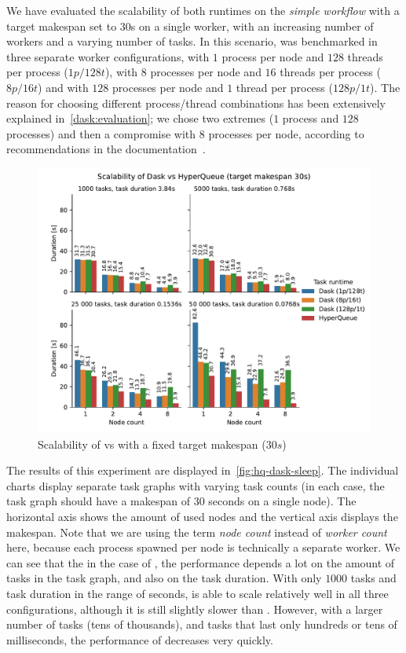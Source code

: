 We have evaluated the scalability of both runtimes on the \emph{simple workflow} with a target
makespan set to $30$s on a single worker, with an increasing number of workers and a varying
number of tasks. In this scenario, \dask{} was benchmarked in three separate worker
configurations, with $1$ process per node and $128$ threads per
process ($1p/128t$), with $8$ processes per node and
$16$ threads per process ($8p/16t$) and with $128$
processes per node and $1$ thread per process ($128p/1t$). The
reason for choosing different process/thread combinations has been extensively explained
in~\autoref{dask:evaluation}; we chose two extremes ($1$ process and
$128$ processes) and then a compromise with $8$ processes per
node, according to recommendations in the \dask{}
documentation~\cite{dask-thread-recommendation}.

\begin{figure}[h]
	\centering
	\includegraphics[width=\textwidth]{imgs/hq/charts/dask-vs-hq-sleep}
	\caption{Scalability of \hyperqueue{} vs \dask{} with a fixed target makespan
	($30s$)}
	\label{fig:hq-dask-sleep}
\end{figure}

The results of this experiment are displayed in~\autoref{fig:hq-dask-sleep}. The individual charts
display separate task graphs with varying task counts (in each case, the task graph should have a
makespan of $30$ seconds on a single node). The horizontal axis shows the amount
of used nodes and the vertical axis displays the makespan. Note that we are using the term
\emph{node count} instead of \emph{worker count} here, because each
\dask{} process spawned per node is technically a separate worker. We can see that
the in the case of \dask{}, the performance depends a lot on the amount of tasks in
the task graph, and also on the task duration. With only $1000$ tasks and task
duration in the range of seconds, \dask{} is able to scale relatively well in all
three configurations, although it is still slightly slower than \hyperqueue{}. However,
with a larger number of tasks (tens of thousands), and tasks that last only hundreds or tens of
milliseconds, the performance of \dask{} decreases very quickly.

